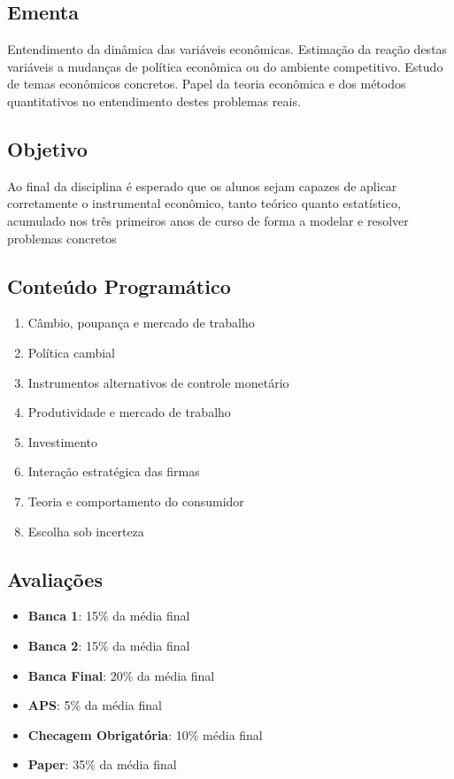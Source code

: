 \documentclass[a4paper,12pt]{article}[abnt2]
\begin{document}
\subsection*{\textbf{Ementa}}
Entendimento da dinâmica das variáveis econômicas. Estimação da reação destas variáveis a mudanças de política econômica ou do ambiente competitivo. Estudo de temas econômicos concretos. Papel da teoria econômica e dos métodos quantitativos no entendimento destes problemas reais.

\subsection*{\textbf{Objetivo}}
Ao final da disciplina é esperado que os alunos sejam capazes de aplicar corretamente o instrumental econômico, tanto teórico quanto estatístico, acumulado nos três primeiros anos de curso de forma a modelar e resolver problemas concretos

\subsection*{\textbf{Conteúdo Programático}}

\begin{enumerate}
    \item Câmbio, poupança e mercado de trabalho
    \item Política cambial
    \item Instrumentos alternativos de controle monetário
    \item Produtividade e mercado de trabalho
    \item Investimento
    \item Interação estratégica das firmas
    \item Teoria e comportamento do consumidor
    \item Escolha sob incerteza
\end{enumerate}

\subsection*{\textbf{Avaliações}}
\begin{itemize}
    \item \textbf{Banca 1}: 15\% da média final 
    \item \textbf{Banca 2}: 15\% da média final
    \item \textbf{Banca Final}: 20\% da média final
    \item \textbf{APS}: 5\% da média final
    \item \textbf{Checagem Obrigatória}: 10\% média final
    \item \textbf{Paper}: 35\% da média final
\end{itemize}
\end{document}
